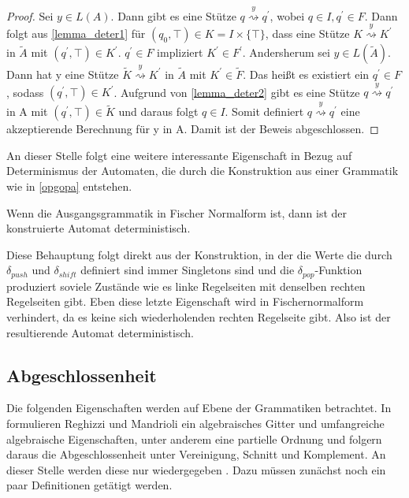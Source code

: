\begin{proof}
Sei $y \in L(A)$. Dann gibt es eine Stütze $q \stackrel{y} {\rightsquigarrow} q^\prime$, wobei $q\in I, q^\prime \in F$. Dann folgt aus \autoref{lemma_deter1} für $(q_0, \top) \in K=I \times \{\top\}$, dass eine Stütze $K \stackrel{y}{\rightsquigarrow}K^\prime$ in $\tilde{A}$ mit $(q^\prime, \top) \in K^\prime $. $q^\prime \in F$ impliziert $K^\prime \in F^\prime$.
Andersherum sei $y \in L(\tilde{A})$. Dann hat y eine Stütze $\tilde{K}\stackrel{y}{\rightsquigarrow}K^\prime$ in $\tilde{A}$ mit $K^\prime \in \tilde{F}$. Das heißt es existiert ein $q^\prime \in F$, sodass $(q^\prime, \top) \in K^\prime$. Aufgrund von \autoref{lemma_deter2} gibt es eine Stütze $q \stackrel{y} {\rightsquigarrow} q^\prime$ in A mit $(q^\prime, \top) \in \tilde{K}$ und daraus folgt $q \in I$. Somit definiert $q\stackrel{y}{\rightsquigarrow}q^\prime$ eine akzeptierende Berechnung für y in A.
Damit ist der Beweis abgeschlossen. 
\end{proof}

An dieser Stelle folgt eine weitere interessante Eigenschaft in Bezug auf Determinismus der Automaten, die  durch die Konstruktion aus einer Grammatik wie in \ref{opgopa} entstehen.
\begin{corollary}
Wenn die Ausgangsgrammatik in Fischer Normalform ist, dann ist der konstruierte Automat deterministisch.
\end{corollary}
Diese Behauptung folgt direkt aus der Konstruktion, in der die Werte die durch $\delta_{push}$ und $\delta_{shift}$ definiert sind immer Singletons sind und die $\delta_{pop}$-Funktion produziert soviele Zustände wie es linke Regelseiten mit denselben rechten Regelseiten gibt. Eben diese letzte Eigenschaft wird in Fischernormalform verhindert, da es keine sich wiederholenden rechten Regelseite gibt. Also ist der resultierende Automat deterministisch. 

\subsection{Abgeschlossenheit}
Die folgenden Eigenschaften werden auf Ebene der Grammatiken betrachtet. In \cite{algebraic_properties} formulieren Reghizzi und Mandrioli ein algebraisches Gitter und umfangreiche algebraische Eigenschaften, unter anderem eine partielle Ordnung und folgern daraus die Abgeschlossenheit unter Vereinigung, Schnitt und Komplement. An dieser Stelle werden diese nur wiedergegeben \cite{op_vpl_property}. Dazu müssen zunächst noch ein paar Definitionen getätigt werden. 

